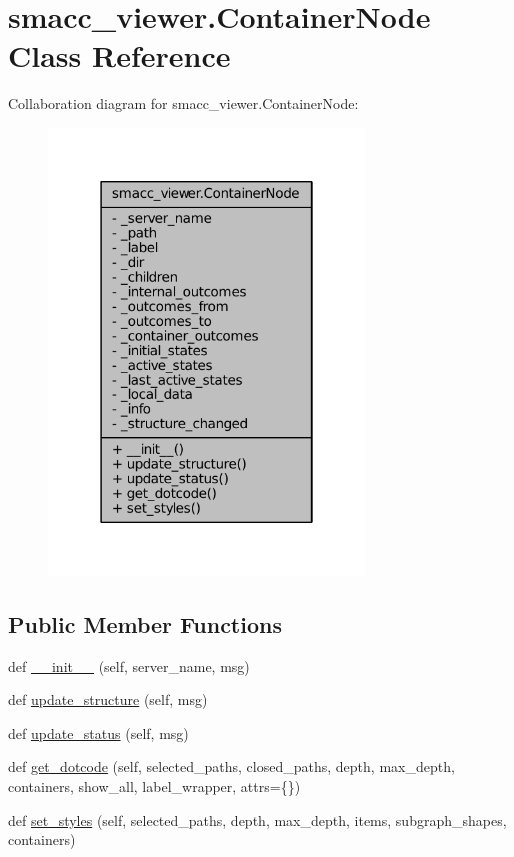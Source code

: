 \hypertarget{classsmacc__viewer_1_1ContainerNode}{}\section{smacc\+\_\+viewer.\+Container\+Node Class Reference}
\label{classsmacc__viewer_1_1ContainerNode}


Collaboration diagram for smacc\+\_\+viewer.\+Container\+Node\+:
\nopagebreak
\begin{figure}[H]
\begin{center}
\leavevmode
\includegraphics[width=238pt]{classsmacc__viewer_1_1ContainerNode__coll__graph}
\end{center}
\end{figure}
\subsection*{Public Member Functions}
\begin{DoxyCompactItemize}
\item 
def \hyperlink{classsmacc__viewer_1_1ContainerNode_a1bd3d888ed6e16752a066e0fb081ac2e}{\+\_\+\+\_\+init\+\_\+\+\_\+} (self, server\+\_\+name, msg)
\item 
def \hyperlink{classsmacc__viewer_1_1ContainerNode_abb9e7a8f8daab12e87231622c85cebad}{update\+\_\+structure} (self, msg)
\item 
def \hyperlink{classsmacc__viewer_1_1ContainerNode_a91546f29baa378bb672873b3caf05ef2}{update\+\_\+status} (self, msg)
\item 
def \hyperlink{classsmacc__viewer_1_1ContainerNode_ae94079c15f311a526219155705e19fe0}{get\+\_\+dotcode} (self, selected\+\_\+paths, closed\+\_\+paths, depth, max\+\_\+depth, containers, show\+\_\+all, label\+\_\+wrapper, attrs=\{\})
\item 
def \hyperlink{classsmacc__viewer_1_1ContainerNode_ae35633b977b8ea568e70a62dcd3c4632}{set\+\_\+styles} (self, selected\+\_\+paths, depth, max\+\_\+depth, items, subgraph\+\_\+shapes, containers)
\end{DoxyCompactItemize}
